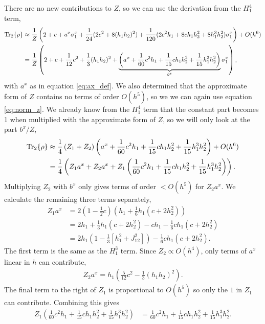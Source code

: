 There are no new contributions to $Z$, so we can use the derivation from the $H_1^4$ term,
\begin{align*}
    \Tr_2\{\rho\}  & \approx \frac{1}{Z} \left(2+c + a^x {\sigma^{x}_1} + \frac{1}{24}(2c^2+ 8(h_1 h_2)^2) + \frac{1}{120}(2c^2 h_1  + 8c h_1 h_2^2 +  8 h_1^3 h_2^2){\sigma^{x}_1}\right) + O(h^6)\\
    & = \frac{1}{Z} \left(2+c+ \frac{1}{12} c^2 + \frac{1}{3}(h_1 h_2)^2 + \underbrace{\left( a^x + \frac{1}{60}c^2 h_1  + \frac{1}{15}c h_1 h_2^2 +  \frac{1}{15}h_1^3 h_2^2\right)}_{b^x}{\sigma^{x}_1} \right),
\end{align*}
with $a^x$ as in equation \ref{eq:ax_def}. We also determined that the approximate form of $Z$ contains no terms of order $O(h^5)$, so we we can again use equation \ref{eq:norm_z}. We already know from the $H_1^4$ term that the constant part becomes 1 when multiplied with the approximate form of $Z$, so we will only look at the part $b^x /Z $,
\begin{align*}
    \Tr_2\{\rho\}  & \approx  \frac{1}{4}\left(Z_1 + Z_2 \right) \left( a^x + \frac{1}{60}c^2 h_1  + \frac{1}{15}c h_1 h_2^2 +  \frac{1}{15}h_1^3 h_2^2\right) + O(h^6)\\
    & =  \frac{1}{4}\left(Z_1 a^x + Z_2 a^x + Z_1\left(\frac{1}{60}c^2 h_1  + \frac{1}{15}c h_1 h_2^2 +  \frac{1}{15}h_1^3 h_2^2\right)\right) .
\end{align*}
Multiplying $Z_2$ with $b^x$ only gives terms of order $<O(h^5)$ for $Z_2 a^x$. We calculate the remaining three terms separately,
\begin{align*}
    Z_1 a^x &= 2 (1 - \frac{1}{2}c) \left(h_1 + \frac{1}{6} h_1 \left(c  + 2 h_2^2 \right)\right)\\
    & =  2h_1 + \frac{1}{3} h_1 \left(c  + 2 h_2^2 \right) - c h_1 - \frac{1}{6} c h_1 \left(c  + 2 h_2^2 \right)\\
    & =  2 h_1 \left(1  - \frac{1}{3} \left[h_1^2 + J_{12}^2 \right] \right) - \frac{1}{6} c h_1 \left(c  + 2 h_2^2 \right).
\end{align*}
The first term is the same as the $H_1^3$ term. Since $Z_2 \propto O(h^4)$, only terms of $a^x$ linear in $h$ can contribute,
\begin{align*}
   Z_2 a^x = h_1(\frac{5}{12} c^2 - \frac{1}{3} (h_1h_2)^2).
\end{align*}
The final term to the right of $Z_1$ is proportional to $O(h^5)$ so only the $1$ in $Z_1$ can contribute. Combining this gives
\begin{align*}
     Z_1\left(\frac{1}{60}c^2 h_1  + \frac{1}{15}c h_1 h_2^2 +  \frac{1}{15}h_1^3 h_2^2\right) & =\frac{1}{60}c^2 h_1  + \frac{1}{15}c h_1 h_2^2 +  \frac{1}{15}h_1^3 h_2^2.
\end{align*}
